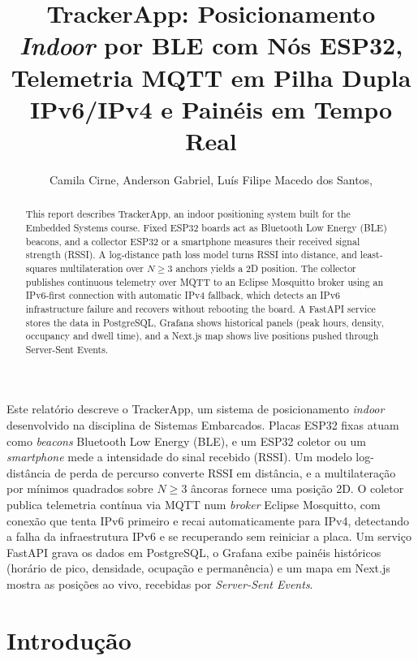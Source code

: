 \documentclass[12pt]{article}
\title{TrackerApp: Posicionamento \textit{Indoor} por BLE com Nós ESP32,
Telemetria MQTT em Pilha Dupla IPv6/IPv4 e Painéis em Tempo Real}
\author{Camila Cirne\inst{1}, Anderson Gabriel\inst{1}, Luís Filipe Macedo dos Santos\inst{1},\\
\pendente{demais integrantes}\inst{1}}
\begin{document}
\maketitle

\begin{abstract}
This report describes TrackerApp, an indoor positioning system built for the Embedded Systems
course. Fixed ESP32 boards act as Bluetooth Low Energy (BLE) beacons, and a collector ESP32 or a
smartphone measures their received signal strength (RSSI). A log-distance path loss model turns
RSSI into distance, and least-squares multilateration over $N \geq 3$ anchors yields a 2D
position. The collector publishes continuous telemetry over MQTT to an Eclipse Mosquitto broker
using an IPv6-first connection with automatic IPv4 fallback, which detects an IPv6 infrastructure
failure and recovers without rebooting the board. A FastAPI service stores the data in
PostgreSQL, Grafana shows historical panels (peak hours, density, occupancy and dwell time), and a
Next.js map shows live positions pushed through Server-Sent Events.
\end{abstract}

\begin{resumo}
Este relatório descreve o TrackerApp, um sistema de posicionamento \textit{indoor} desenvolvido na
disciplina de Sistemas Embarcados. Placas ESP32 fixas atuam como \textit{beacons} Bluetooth Low
Energy (BLE), e um ESP32 coletor ou um \textit{smartphone} mede a intensidade do sinal recebido
(RSSI). Um modelo log-distância de perda de percurso converte RSSI em distância, e a
multilateração por mínimos quadrados sobre $N \geq 3$ âncoras fornece uma posição 2D. O coletor
publica telemetria contínua via MQTT num \textit{broker} Eclipse Mosquitto, com conexão que tenta
IPv6 primeiro e recai automaticamente para IPv4, detectando a falha da infraestrutura IPv6 e se
recuperando sem reiniciar a placa. Um serviço FastAPI grava os dados em PostgreSQL, o Grafana
exibe painéis históricos (horário de pico, densidade, ocupação e permanência) e um mapa em Next.js
mostra as posições ao vivo, recebidas por \textit{Server-Sent Events}.
\end{resumo}

\section{Introdução}
\label{sec:intro}
\end{document}
